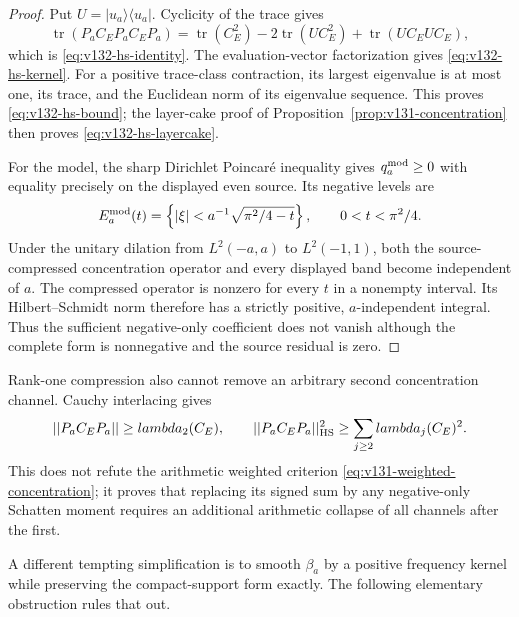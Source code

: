 \documentclass[11pt]{article}
\def\lambda{lambda}%
\def\norm#1{||#1||}%
\theoremstyle{remark}
\newcommand{\norm}[1]{\left\lVert #1\right\rVert}
\begin{document}
\begin{proof}
Put $U=|u_a\rangle\langle u_a|$. Cyclicity of the trace gives
\[
 \operatorname {tr}(P_aC_EP_aC_EP_a)
 =\operatorname {tr}(C_E^2)-2\operatorname {tr}(UC_E^2)
   +\operatorname {tr}(UC_EUC_E),
\]
which is \eqref{eq:v132-hs-identity}. The evaluation-vector
factorization gives \eqref{eq:v132-hs-kernel}. For a positive
trace-class contraction, its largest eigenvalue is at most one, its
trace, and the Euclidean norm of its eigenvalue sequence. This proves
\eqref{eq:v132-hs-bound}; the layer-cake proof of
Proposition~\ref{prop:v131-concentration} then proves
\eqref{eq:v132-hs-layercake}.

For the model, the sharp Dirichlet Poincar\'e inequality gives
$q_a^{\rm mod}\ge0$ with equality precisely on the displayed even
source. Its negative levels are
\[
 E_a^{\rm mod}(t)=\left\{|\xi|<a^{-1}
       \sqrt{\pi^2/4-t}\right\},
 \qquad 0<t<\pi^2/4.
\]
Under the unitary dilation from $L^2(-a,a)$ to $L^2(-1,1)$, both the
source-compressed concentration operator and every displayed band
become independent of $a$. The compressed operator is nonzero for
every $t$ in a nonempty interval. Its Hilbert--Schmidt norm therefore
has a strictly positive, $a$-independent integral. Thus the sufficient
negative-only coefficient does not vanish although the complete form
is nonnegative and the source residual is zero.
\end{proof}

Rank-one compression also cannot remove an arbitrary second
concentration channel. Cauchy interlacing gives
\begin{equation}\label{eq:v132-interlace}
 \norm{P_aC_EP_a}\ge\lambda_2(C_E),
 \qquad
 \norm{P_aC_EP_a}_{\rm HS}^2
     \ge\sum_{j\ge2}\lambda_j(C_E)^2.
\end{equation}
This does not refute the arithmetic weighted criterion
\eqref{eq:v131-weighted-concentration}; it proves that replacing its
signed sum by any negative-only Schatten moment requires an additional
arithmetic collapse of all channels after the first.

A different tempting simplification is to smooth $\beta_a$ by a
positive frequency kernel while preserving the compact-support form
exactly. The following elementary obstruction rules that out.
\end{document}

